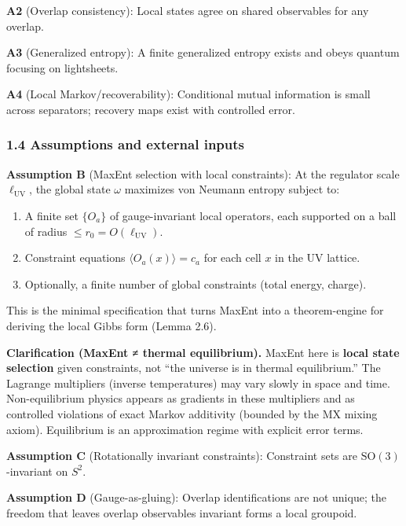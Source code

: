 \documentclass[
]{article}
\providecommand{\tightlist}{%
  \setlength{\itemsep}{0pt}\setlength{\parskip}{0pt}}
\begin{document}
\textbf{A2} (Overlap consistency): Local states agree on shared
observables for any overlap.

\textbf{A3} (Generalized entropy): A finite generalized entropy exists
and obeys quantum focusing on lightsheets.

\textbf{A4} (Local Markov/recoverability): Conditional mutual
information is small across separators; recovery maps exist with
controlled error.

\subsubsection{1.4 Assumptions and external
inputs}\label{assumptions-and-external-inputs}

\textbf{Assumption B} (MaxEnt selection with local constraints): At the
regulator scale \(\ell_{\mathrm{UV}}\), the global state \(\omega\)
maximizes von Neumann entropy subject to:

\begin{enumerate}
\def\labelenumi{\arabic{enumi}.}
\tightlist
\item
  A finite set \(\{O_a\}\) of gauge-invariant local operators, each
  supported on a ball of radius \(\le r_0 = O(\ell_{\mathrm{UV}})\).
\item
  Constraint equations \(\langle O_a(x) \rangle = c_a\) for each cell
  \(x\) in the UV lattice.
\item
  Optionally, a finite number of global constraints (total energy,
  charge).
\end{enumerate}

This is the minimal specification that turns MaxEnt into a
theorem-engine for deriving the local Gibbs form (Lemma 2.6).

\textbf{Clarification (MaxEnt ≠ thermal equilibrium).} MaxEnt here is
\textbf{local state selection} given constraints, not ``the universe is
in thermal equilibrium.'' The Lagrange multipliers (inverse
temperatures) may vary slowly in space and time. Non-equilibrium physics
appears as gradients in these multipliers and as controlled violations
of exact Markov additivity (bounded by the MX mixing axiom). Equilibrium
is an approximation regime with explicit error terms.

\textbf{Assumption C} (Rotationally invariant constraints): Constraint
sets are \(\mathrm{SO}(3)\)-invariant on \(S^2\).

\textbf{Assumption D} (Gauge-as-gluing): Overlap identifications are not
unique; the freedom that leaves overlap observables invariant forms a
local groupoid.
\end{document}
